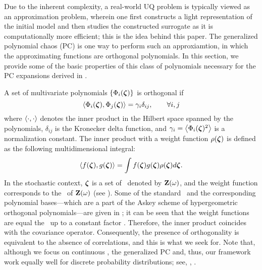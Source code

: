 
Due to the inherent complexity, a real-world UQ problem is typically viewed as an approximation problem, wherein one first constructs a light representation of the initial model and then studies the constructed surrogate as it is computationally more efficient; this is the idea behind this paper. The generalized polynomial chaos (PC) \cite{xiu2002} is one way to perform such an approxiamtion, in which the approximating functions are orthogonal polynomials. In this section, we provide some of the basic properties \cite{xiu2010, maitre2010} of this class of polynomials necessary for the PC expansions derived in .

A set of multivariate polynomials $\{ \Phi_i(\boldsymbol{\zeta}) \}$ is orthogonal if
\begin{equation} \elabel{orthogonality}
  \oInner{\pcb_i(\vz)}{\pcb_j(\vz)} = \pcn_i \delta_{ij}, \qquad \forall i, j
\end{equation}
where $\oInner{\idot}{\idot}$ denotes the inner product in the Hilbert space spanned by the polynomials, $\delta_{ij}$ is the Kronecker delta function, and $\pcn_i = \oInner{\pcb_i(\vz)^2}$ is a normalization constant. The inner product with a weight function $\rho(\boldsymbol{\zeta})$ is defined as the following multidimensional integral:
\begin{equation} \elabel{inner-product}
  \oInner{f(\vz)}{g(\vz)} = \int f(\vz) g(\vz) \PDF(\vz) d\vz.
\end{equation}
In the stochastic context, $\boldsymbol{\zeta}$ is a set of \rvs\ denoted by $\mathbf{Z}(\omega)$, and the weight function corresponds to the \pdf\ of $\mathbf{Z}(\omega)$ (see ). Some of the standard \pdfs\ and the corresponding polynomial bases---which are a part of the Askey scheme \cite{xiu2002} of hypergeometric orthogonal polynomials---are given in ; it can be seen that the weight functions are equal the \pdfs\ up to a constant factor \cite{durrett2010}. Therefore, the inner product coincides with the covariance operator. Consequently, the presence of orthogonality is equivalent to the absence of correlations, and this is what we seek for. Note that, although we focus on continuous \rvs, the generalized PC and, thus, our framework work equally well for discrete probability distributions; see, \eg, \cite{xiu2010, maitre2010, xiu2002}.

